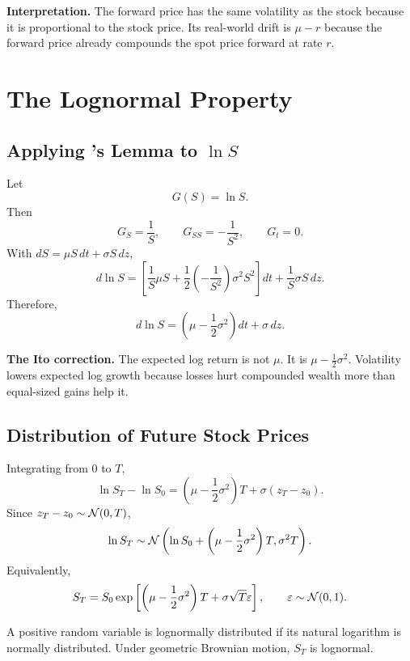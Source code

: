 \begin{boxD}
\textbf{Interpretation.} The forward price has the same volatility as the stock
because it is proportional to the stock price. Its real-world drift is
$\mu-r$ because the forward price already compounds the spot price forward at
rate $r$.
\end{boxD}

\section{The Lognormal Property}

\subsection{Applying \Ito's Lemma to $\ln S$}

Let
\[
    G(S)=\ln S.
\]
Then
\[
    G_S=\frac{1}{S},
    \qquad
    G_{SS}=-\frac{1}{S^2},
    \qquad
    G_t=0.
\]
With $dS=\mu S\,dt+\sigma S\,dz$,
\[
    d\ln S
    =
    \left[
        \frac{1}{S}\mu S
        +
        \frac{1}{2}\left(-\frac{1}{S^2}\right)\sigma^2S^2
    \right]dt
    +
    \frac{1}{S}\sigma S\,dz.
\]
Therefore,
\[
    d\ln S
    =
    \left(\mu-\frac{1}{2}\sigma^2\right)dt
    +
    \sigma\,dz.
\]

\begin{boxF}
\textbf{The Ito correction.} The expected log return is not $\mu$. It is
$\mu-\frac{1}{2}\sigma^2$. Volatility lowers expected log growth because losses
hurt compounded wealth more than equal-sized gains help it.
\end{boxF}

\subsection{Distribution of Future Stock Prices}

Integrating from 0 to $T$,
\[
    \ln S_T-\ln S_0
    =
    \left(\mu-\frac{1}{2}\sigma^2\right)T+\sigma(z_T-z_0).
\]
Since $z_T-z_0\sim\mathcal{N}(0,T)$,
\[
    \ln S_T
    \sim
    \mathcal{N}\left(
        \ln S_0+\left(\mu-\frac{1}{2}\sigma^2\right)T,
        \sigma^2T
    \right).
\]
Equivalently,
\[
    S_T
    =
    S_0
    \exp\left[
        \left(\mu-\frac{1}{2}\sigma^2\right)T
        +
        \sigma\sqrt{T}\varepsilon
    \right],
    \qquad
    \varepsilon\sim\mathcal{N}(0,1).
\]

\begin{defN}
A positive random variable is lognormally distributed if its natural logarithm
is normally distributed. Under geometric Brownian motion, $S_T$ is lognormal.
\end{defN}

